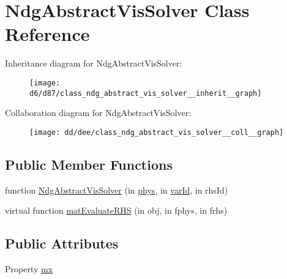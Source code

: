 \hypertarget{class_ndg_abstract_vis_solver}{}\section{Ndg\+Abstract\+Vis\+Solver Class Reference}
\label{class_ndg_abstract_vis_solver}


Inheritance diagram for Ndg\+Abstract\+Vis\+Solver\+:
\nopagebreak
\begin{figure}[H]
\begin{center}
\leavevmode
\texttt{[image: d6/d87/class\_ndg\_abstract\_vis\_solver\_\_inherit\_\_graph]}
\end{center}
\end{figure}


Collaboration diagram for Ndg\+Abstract\+Vis\+Solver\+:
\nopagebreak
\begin{figure}[H]
\begin{center}
\leavevmode
\texttt{[image: dd/dee/class\_ndg\_abstract\_vis\_solver\_\_coll\_\_graph]}
\end{center}
\end{figure}
\subsection*{Public Member Functions}
\begin{DoxyCompactItemize}
\item 
function \hyperlink{class_ndg_abstract_vis_solver_ac24cba83f478b83daeab738fd6e45838}{Ndg\+Abstract\+Vis\+Solver} (in \hyperlink{class_ndg_abstract_vis_solver_a47663b482747f4136520112484ee2fcd}{phys}, in \hyperlink{class_ndg_abstract_vis_solver_ae28ac2785a59d4c1d8b59e578150a50b}{var\+Id}, in rhs\+Id)
\item 
virtual function \hyperlink{class_ndg_abstract_vis_solver_a4fd08bf9865f2fc92c758e6f634c406b}{mat\+Evaluate\+R\+HS} (in obj, in fphys, in frhs)
\end{DoxyCompactItemize}
\subsection*{Public Attributes}
\begin{DoxyCompactItemize}
\item 
Property \hyperlink{class_ndg_abstract_vis_solver_a7c82c919606f92b47a2ebff8ee802326}{mx}
\end{DoxyCompactItemize}
